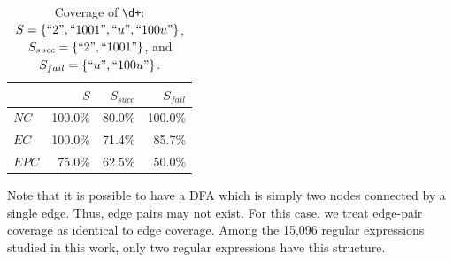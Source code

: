 \begin{table}[tb]
\caption{Coverage of {\tt \textbackslash d+}:  $S = \{``2", ``1001", ``u", ``100u"\}$, \\$S_{succ} = \{``2", ``1001"\}$, and $S_{fail} = \{``u", ``100u"\}$.}
\label{coverageExample}
\vspace{-6pt}
\begin{tabular}{l | r r r}
		& $S$ 	& $S_{succ}$ 	& $S_{fail}$ \\ \hline
$NC$	& 100.0\%	& 80.0\%	 &	100.0\%	\\
$EC$	& 100.0\% & 71.4\% &	85.7\%	\\
$EPC$	& 75.0\%	& 62.5\% &	50.0\%	\\
\hline
\end{tabular}
\vspace{-12pt}
\end{table}

Note that it is possible to have a DFA which is simply two nodes connected by a single edge. Thus, edge pairs may not exist.  For this case, we treat edge-pair coverage as identical to edge coverage. Among the 15,096 regular expressions studied in this work, only two regular expressions have this structure. 

 

%
